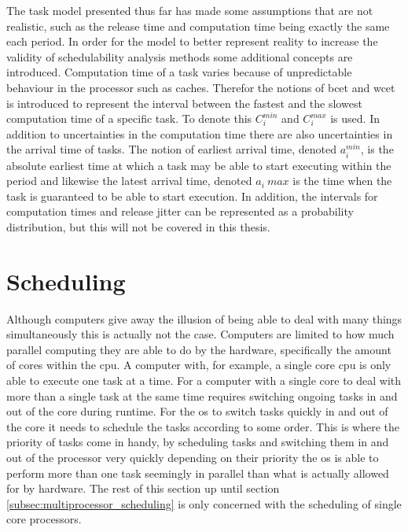 \documentclass{kththesis}
\begin{document}
The task model presented thus far has made some assumptions that are not realistic, such as the
release time and computation time being exactly the same each period. In order for the model to
better represent reality to increase the validity of schedulability analysis methods some additional
concepts are introduced. Computation time of a task varies because of unpredictable behaviour in the
processor such as caches. Therefor the notions of \acrfull{bcet} and \acrfull{wcet} is introduced to
represent the interval between the fastest and the slowest computation time of a specific task.  To
denote this $ C_i^{min} $ and $ C_i^{max} $ is used. In addition to uncertainties in the computation
time there are also uncertainties in the arrival time of tasks. The notion of earliest arrival time,
denoted $ a_i^{min} $, is the  absolute earliest time at which a task may be able to start executing
within the period and likewise the latest arrival time, denoted $ a_i~{max} $ is the time when the
task is guaranteed to be able to start execution. In addition, the intervals for computation times
and release jitter can be represented as a probability distribution, but this will not be covered in
this thesis.


\section{Scheduling} \label{sec:scheduling}

Although computers give away the illusion of being able to deal with many things simultaneously this
is actually not the case. Computers are limited to how much parallel computing they are able to do
by the hardware, specifically the amount of cores within the \acrshort{cpu}. A computer with, for
example, a single core \acrshort{cpu} is only able to execute one task at a time. For a computer
with a single core to deal with more than a single task at the same time requires switching ongoing
tasks in and out of the core during runtime. For the \acrshort{os} to switch tasks quickly in and
out of the core it needs to schedule the tasks according to some order. This is where the priority
of tasks come in handy, by scheduling tasks and switching them in and out of the processor very
quickly depending on their priority the \acrshort{os} is able to perform more than one task seemingly in
parallel than what is actually allowed for by hardware. The rest of this section up until section
\ref{subsec:multiprocessor_scheduling} is only concerned with the scheduling of single core
processors.
\end{document}

